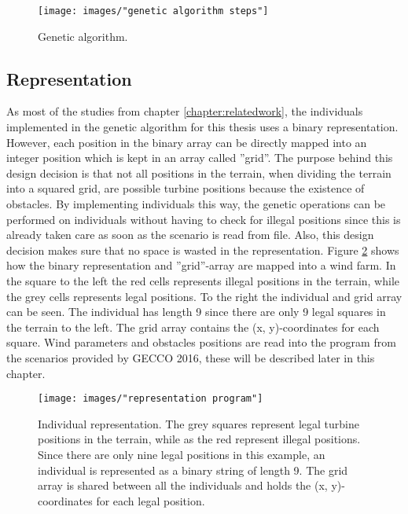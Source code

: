 \begin{figure}[h!]
\begin{center}
\texttt{[image: images/"genetic algorithm steps"]}
\caption{Genetic algorithm.}
\label{figure:genetic algorithm steps}
\end{center}
\end{figure}


\subsection{Representation}
As most of the studies from chapter \ref{chapter:relatedwork}, the individuals implemented in the genetic algorithm for this thesis uses a binary representation. However, each position in the binary array can be directly mapped into an integer position which is kept in an array called ''grid''. The purpose behind this design decision is that not all positions in the terrain, when dividing the terrain into a squared grid, are possible turbine positions because the existence of obstacles. By implementing individuals this way, the genetic operations can be performed on individuals without having to check for illegal positions since this is already taken care as soon as the scenario is read from file. Also, this design decision makes sure that no space is wasted in the representation. Figure \ref{figure:representation} shows how the binary representation and ''grid''-array are mapped into a wind farm. In the square to the left the red cells represents illegal positions in the terrain, while the grey cells represents legal positions. To the right the individual and grid array can be seen. The individual has length 9 since there are only 9 legal squares in the terrain to the left. The grid array contains the (x, y)-coordinates for each square. Wind parameters and obstacles positions are read into the program from the scenarios provided by GECCO 2016, these will be described later in this chapter.


\begin{figure}[h!]
\begin{center}
\texttt{[image: images/"representation program"]}
\caption{Individual representation. The grey squares represent legal turbine positions in the terrain, while as the red represent illegal positions. Since there are only nine legal positions in this example, an individual is represented as a binary string of length 9. The grid array is shared between all the individuals and holds the (x, y)-coordinates for each legal position.}
\label{figure:representation}
\end{center}
\end{figure}


